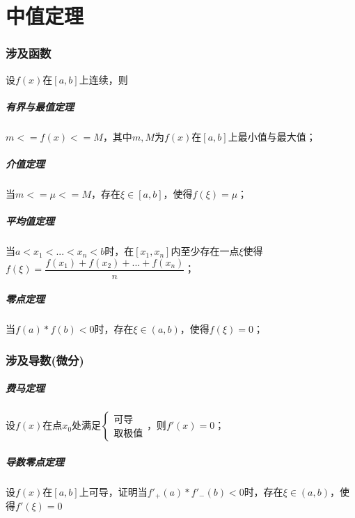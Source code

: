 
\chapter{中值定理}

\subsection{涉及函数}
设\(f(x)\)在\([a, b]\)上连续，则
\paragraph{有界与最值定理}
\(m <= f(x) <= M\)，其中\(m, M\)为\(f(x)\)在\([a, b]\)上最小值与最大值；

\paragraph{介值定理}
当\(m <= \mu <= M\)，存在\(\xi \in [a, b]\)，使得\(f(\xi) = \mu\)；

\paragraph{平均值定理}
当\(a < x_1 < ... < x_n < b\)时，在\([x_1, x_n]\)内至少存在一点\(\xi\)使得\(f(\xi) = \dfrac{f(x_1) + f(x_2) + ... + f(x_n)}{n}\)；

\paragraph{零点定理}
当\(f(a) * f(b) < 0\)时，存在\(\xi \in (a, b)\)，使得\(f(\xi) = 0\)；

\subsection{涉及导数(微分)}
\paragraph{费马定理}
设\(f(x)\)在点\(x_0\)处满足\(\begin{cases}
\text{可导} \\ 
\text{取极值}
\end{cases}\)，则\(f'(x) = 0\)；

\paragraph{导数零点定理}
设\(f(x)\)在\([a, b]\)上可导，证明当\(f'_+(a) * f'_-(b) < 0\)时，存在\(\xi \in (a, b)\)，使得\(f'(\xi) = 0\)

